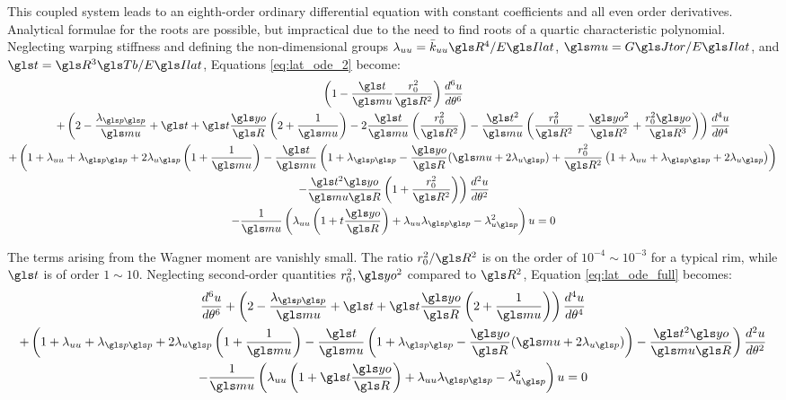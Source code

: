 \documentclass[\rootdir/thesis.tex]{subfiles}
\begin{document}
This coupled system leads to an eighth-order ordinary differential equation with constant coefficients and all even order derivatives. Analytical formulae for the roots are possible, but impractical due to the need to find roots of a quartic characteristic polynomial. Neglecting warping stiffness and defining the non-dimensional groups $\lr_{uu}=\kuu \R^4/\EIl$, $\m=\GJ/\EIl$, and $\ts=\R^3\Tb/\EIl$, Equations \eqref{eq:lat_ode_2} become:
\begin{multline}
\label{eq:lat_ode_full}
  \left(1 - \frac{\ts}{\m}\frac{\ro^2}{\R^2}\right)\dt{u}{6}\\
  +\left(2 - \frac{\lr_{\p\p}}{\m} + \ts + \ts\frac{\yo}{\R}\left(2 + \frac{1}{\m}\right)
         -2\frac{\ts}{\m}\left(\frac{\ro^2}{\R^2}\right)
         -\frac{\ts^2}{\m}\left(\frac{\ro^2}{\R^2} - \frac{\yo^2}{\R^2} +
                               \frac{\ro^2\yo}{\R^3}\right) \right) \dt{u}{4}\\
  +\left(1 + \lr_{uu} + \lr_{\p\p} + 2\lr_{u\p}\left(1+\frac{1}{\m}\right)
         -\frac{\ts}{\m}\left(1 + \lr_{\p\p}
                             -\frac{\yo}{\R}(\m + 2\lr_{u\p})
                             +\frac{\ro^2}{\R^2}\left(1 + \lr_{uu} + \lr_{\p\p} + 2\lr_{u\p}\right)\right)\right.\\
         \left.-\frac{\ts^2\yo}{\m \R}\left(1 + \frac{\ro^2}{\R^2}\right)\right)\dt{u}{2}\\
  -\frac{1}{\m}\left(\lr_{uu}\left(1+t\frac{\yo}{\R}\right)
                      +\lr_{uu}\lr_{\p\p} - \lr_{u\p}^2\right)u = 0
\end{multline}

The terms arising from the Wagner moment are vanishly small. The ratio $\ro^2/\R^2$ is on the order of $10^{-4}\sim10^{-3}$ for a typical rim, while $\ts$ is of order $1\sim10$. Neglecting second-order quantities $\ro^2,\yo^2$ compared to $\R^2$, Equation \eqref{eq:lat_ode_full} becomes:
\begin{multline}
\label{eq:lat_ode}
  \dt{u}{6}
  +\left(2 - \frac{\lr_{\p\p}}{\m} + \ts + \ts\frac{\yo}{\R}\left(2 + \frac{1}{\m}\right)
         \right) \dt{u}{4}\\
  +\left(1 + \lr_{uu} + \lr_{\p\p} + 2\lr_{u\p}\left(1+\frac{1}{\m}\right)
         -\frac{\ts}{\m}\left(1 + \lr_{\p\p}
                             -\frac{\yo}{\R}(\m + 2\lr_{u\p})
                             \right)
         -\frac{\ts^2\yo}{\m \R}\right)\dt{u}{2}\\
  -\frac{1}{\m}\left(\lr_{uu}\left(1+\ts\frac{\yo}{\R}\right)
                      +\lr_{uu}\lr_{\p\p} - \lr_{u\p}^2\right)u = 0
\end{multline}
\end{document}
